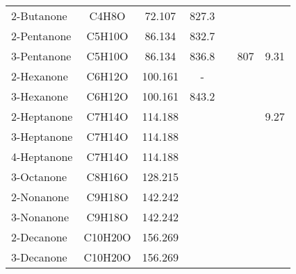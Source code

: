 \begin{landscape}
\begin{longtable}[c]{@{}lcccccc@{}}
2-Butanone           & C4H8O            & 72.107              & 827.3                        &                               &                          &                  \\
2-Pentanone          & C5H10O           & 86.134              & 832.7                        &                               &                          &                  \\
3-Pentanone          & C5H10O           & 86.134              & 836.8                        &                               & 807                      & 9.31             \\
2-Hexanone           & C6H12O           & 100.161             & -                            &                               &                          &                  \\
3-Hexanone           & C6H12O           & 100.161             & 843.2                        &                               &                          &                  \\
2-Heptanone          & C7H14O           & 114.188             &                              &                               &                          & 9.27             \\
3-Heptanone          & C7H14O           & 114.188             &                              &                               &                          &                  \\
4-Heptanone          & C7H14O           & 114.188             &                              &                               &                          &                  \\
3-Octanone           & C8H16O           & 128.215             &                              &                               &                          &                  \\
2-Nonanone           & C9H18O           & 142.242             &                              &                               &                          &                  \\
3-Nonanone           & C9H18O           & 142.242             &                              &                               &                          &                  \\
2-Decanone           & C10H20O          & 156.269             &                              &                               &                          &                  \\
3-Decanone           & C10H20O          & 156.269             &                              &                               &                          &                  \\

\end{longtable}
\end{landscape}
